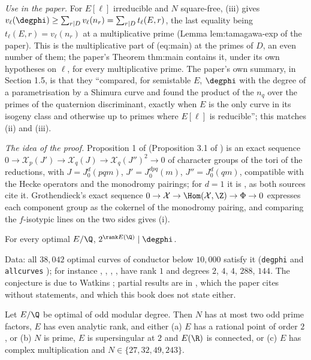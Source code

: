 \begin{remark}
\emph{Use in the paper.} For $E[\ell]$ irreducible and $N$ square-free, (iii) gives
$v_\ell(\degphi)\ge\sum_{r\mid D}v_\ell(n_r)=\sum_{r\mid D}t_\ell(E,r)$, the last equality being $t_\ell(E,r)=v_\ell(n_r)$ at a multiplicative prime (Lemma lem:tamagawa-exp of the paper). This is
the multiplicative part of (eq:main) at the primes of $D$, an even number of them; the paper's Theorem thm:main contains it, under its own hypotheses on $\ell$, for every multiplicative prime. The
paper's own summary, in Section 1.5, is that they ``compared, for semistable $E$, $\degphi$ with the degree of a parametrisation by a Shimura curve and found the product of the $n_q$ over the primes of the quaternion
discriminant, exactly when $E$ is the only curve in its isogeny class and otherwise up to primes where $E[\ell]$ is reducible''; this matches (ii) and (iii).

\emph{The idea of the proof.} Proposition 1 of \cite{RibetTakahashi97} (Proposition 3.1 of \cite{Takahashi01}) is an exact sequence $0\to\mathcal X_p(J')\to\mathcal X_q(J)\to\mathcal X_q(J'')^2\to0$
of character groups of the tori of the reductions, with $J=J_0^d(pqm)$, $J'=J_0^{dpq}(m)$, $J''=J_0^d(qm)$, compatible with the Hecke operators and the monodromy pairings; for $d=1$ it is
\cite[Theorem 4.1]{Ribet90}, as both sources cite it. Grothendieck's exact sequence $0\to\mathcal X\to\Hom(\mathcal X,\Z)\to\Phi\to0$ expresses each component group as the cokernel of the
monodromy pairing, and comparing the $f$-isotypic lines on the two sides gives (i).
\end{remark}

\begin{conjecture}[Watkins]\label{conj:moddeg:watkins}
For every optimal $E/\Q$, $2^{\rank E(\Q)}\mid\degphi$.
\end{conjecture}

Data: all $38{,}042$ optimal curves of conductor below $10{,}000$ satisfy it (\texttt{degphi} and \texttt{allcurves} \cite{ecdata}); for instance , , , , 
have rank $1$ and degrees $2$, $4$, $4$, $288$, $144$. The conjecture is due to Watkins \cite{Watkins02}; partial results are in \cite{Dummigan06,CalegariEmerton09,Yazdani11,CaroPasten22,HatleyKundu,BKP}, which the
paper cites without statements, and which this book does not state either.

\begin{theorem}\label{thm:moddeg:calegari-emerton}
Let $E/\Q$ be optimal of odd modular degree. Then $N$ has at most two odd prime factors, $E$ has even analytic rank, and either (a) $E$ has a rational point of order $2$, or (b) $N$ is prime, $E$
is supersingular at $2$ and $E(\R)$ is connected, or (c) $E$ has complex multiplication and $N\in\{27,32,49,243\}$.
\end{theorem}

